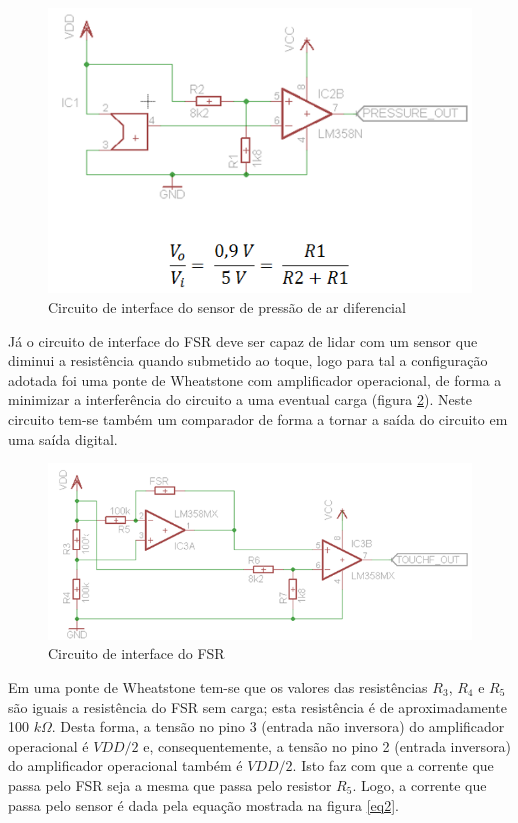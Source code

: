 \begin{figure}[H]
		\centering
			\includegraphics[scale=1.0]{figuras/circuito1.png}
		\caption{Circuito de interface do sensor de pressão de ar diferencial}
		\label{circuito1}
\end{figure}

Já o circuito de interface do FSR deve ser capaz de lidar com um sensor que diminui a resistência quando submetido ao toque, logo para tal a configuração adotada foi uma ponte de Wheatstone com amplificador operacional, de forma a minimizar a interferência do circuito a uma eventual carga (figura \ref{circuito2}). Neste circuito tem-se também um comparador de forma a tornar a saída do circuito em uma saída digital. 

\begin{figure}[H]
		\centering
			\includegraphics[scale=1.0]{figuras/circuito2.png}
		\caption{Circuito de interface do FSR}
		\label{circuito2}
\end{figure}

Em uma ponte de Wheatstone tem-se que os valores das resistências $R_3$, $R_4$ e $R_5$ são iguais a resistência do FSR sem carga; esta resistência é de aproximadamente 100 $k\Omega$. Desta forma, a tensão no pino 3 (entrada não inversora) do amplificador operacional é $VDD/2$ e, consequentemente, a tensão no pino 2 (entrada inversora) do amplificador operacional também é $VDD/2$. Isto faz com que a corrente que passa pelo FSR seja a mesma que passa pelo resistor $R_5$. Logo, a corrente que passa pelo sensor é dada pela equação mostrada na figura \ref{eq2}.

